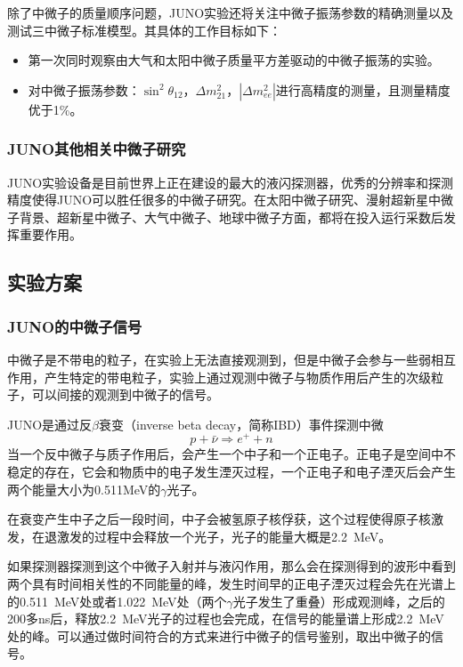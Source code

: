 \documentclass[10pt,a4paper]{article}
\begin{document}
除了中微子的质量顺序问题，JUNO实验还将关注中微子振荡参数的精确测量以及测试三中微子标准模型。其具体的工作目标如下\cite{2009Experimental}：

\begin{itemize}
	\item{第一次同时观察由大气和太阳中微子质量平方差驱动的中微子振荡的实验。}
    
    \item{对中微子振荡参数：$\sin^2{\theta_{12}}$，$\Delta m^2_{21}$，$|\Delta m^2_{ee}|$进行高精度的测量，且测量精度优于1\%。}
\end{itemize}


\subsubsection{JUNO其他相关中微子研究}

JUNO实验设备是目前世界上正在建设的最大的液闪探测器，优秀的分辨率和探测精度使得JUNO可以胜任很多的中微子研究。在太阳中微子研究、漫射超新星中微子背景、超新星中微子、大气中微子、地球中微子方面，都将在投入运行采数后发挥重要作用。

\subsection{实验方案}\label{sub:2}

\subsubsection{JUNO的中微子信号}\label{sub:3}

中微子是不带电的粒子，在实验上无法直接观测到，但是中微子会参与一些弱相互作用，产生特定的带电粒子，实验上通过观测中微子与物质作用后产生的次级粒子，可以间接的观测到中微子的信号。

JUNO是通过反$\beta$衰变（inverse beta decay，简称IBD）事件探测中微$$p+\bar{\nu}\Rightarrow e^{+}+n$$
当一个反中微子与质子作用后，会产生一个中子和一个正电子。正电子是空间中不稳定的存在，它会和物质中的电子发生湮灭过程，一个正电子和电子湮灭后会产生两个能量大小为0.511MeV的$\gamma$光子。

在衰变产生中子之后一段时间，中子会被氢原子核俘获，这个过程使得原子核激发，在退激发的过程中会释放一个光子，光子的能量大概是\SI{2.2}{MeV}。


如果探测器探测到这个中微子入射并与液闪作用，那么会在探测得到的波形中看到两个具有时间相关性的不同能量的峰，发生时间早的正电子湮灭过程会先在光谱上的\SI{0.511}{MeV}处或者\SI{1.022}{MeV}处（两个$\gamma$光子发生了重叠）形成观测峰，之后的200多ns后，释放\SI{2.2}{MeV}光子的过程也会完成，在信号的能量谱上形成\SI{2.2}{MeV}处的峰。可以通过做时间符合的方式来进行中微子的信号鉴别，取出中微子的信号。
\end{document}
